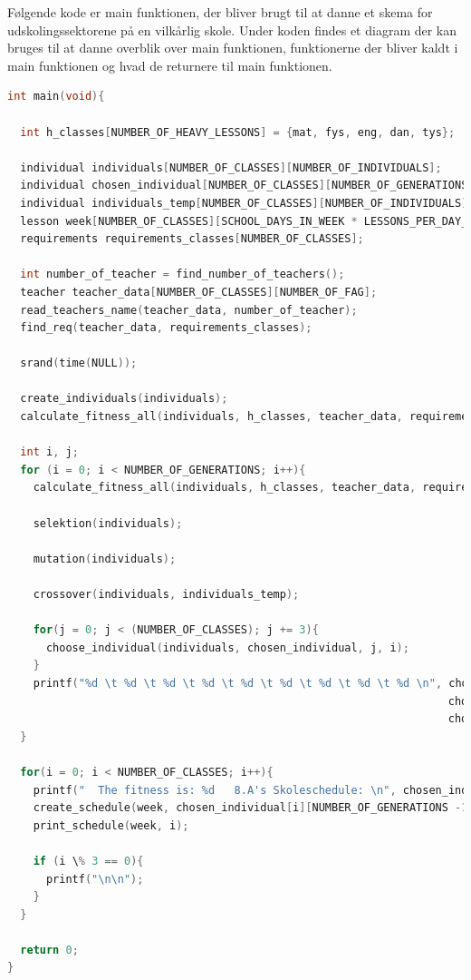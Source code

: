 Følgende kode er main funktionen, der bliver brugt til at danne et skema for udskolingssektorene på en vilkårlig skole. Under koden findes et diagram der kan bruges til at danne overblik over main funktionen, funktionerne der bliver kaldt i main funktionen og hvad de returnere til main funktionen. 
\begin{lstlisting}[showstringspaces=false,language = c]
int main(void){
  
  int h_classes[NUMBER_OF_HEAVY_LESSONS] = {mat, fys, eng, dan, tys};

  individual individuals[NUMBER_OF_CLASSES][NUMBER_OF_INDIVIDUALS];
  individual chosen_individual[NUMBER_OF_CLASSES][NUMBER_OF_GENERATIONS];
  individual individuals_temp[NUMBER_OF_CLASSES][NUMBER_OF_INDIVIDUALS];
  lesson week[NUMBER_OF_CLASSES][SCHOOL_DAYS_IN_WEEK * LESSONS_PER_DAY_MAX];
  requirements requirements_classes[NUMBER_OF_CLASSES];
  
  int number_of_teacher = find_number_of_teachers();
  teacher teacher_data[NUMBER_OF_CLASSES][NUMBER_OF_FAG];
  read_teachers_name(teacher_data, number_of_teacher);
  find_req(teacher_data, requirements_classes);

  srand(time(NULL));

  create_individuals(individuals);
  calculate_fitness_all(individuals, h_classes, teacher_data, requirements_classes);

  int i, j;
  for (i = 0; i < NUMBER_OF_GENERATIONS; i++){
    calculate_fitness_all(individuals, h_classes, teacher_data, requirements_classes);

    selektion(individuals);
    
    mutation(individuals);

    crossover(individuals, individuals_temp);

    for(j = 0; j < (NUMBER_OF_CLASSES); j += 3){
      choose_individual(individuals, chosen_individual, j, i);  
    }
    printf("%d \t %d \t %d \t %d \t %d \t %d \t %d \t %d \t %d \n", chosen_individual[0][i].fitness, chosen_individual[1][i].fitness, chosen_individual[2][i].fitness, 
                                                                    chosen_individual[3][i].fitness, chosen_individual[4][i].fitness, chosen_individual[5][i].fitness, 
                                                                    chosen_individual[6][i].fitness, chosen_individual[7][i].fitness, chosen_individual[8][i].fitness);
  }

  for(i = 0; i < NUMBER_OF_CLASSES; i++){
    printf("  The fitness is: %d   8.A's Skoleschedule: \n", chosen_individual[i][NUMBER_OF_GENERATIONS -1].fitness);
    create_schedule(week, chosen_individual[i][NUMBER_OF_GENERATIONS -1], i);
    print_schedule(week, i);

    if (i \% 3 == 0){
      printf("\n\n");
    }
  }

  return 0;
}
\end{lstlisting}
